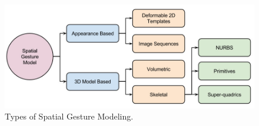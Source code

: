 \begin{figure}
	[h] \centering 
	\includegraphics[width=130mm]{figures/content/ges-model.jpg} \caption{Types of Spatial Gesture Modeling. \cite{2}} \label{fg:ges:model} 
\end{figure}
